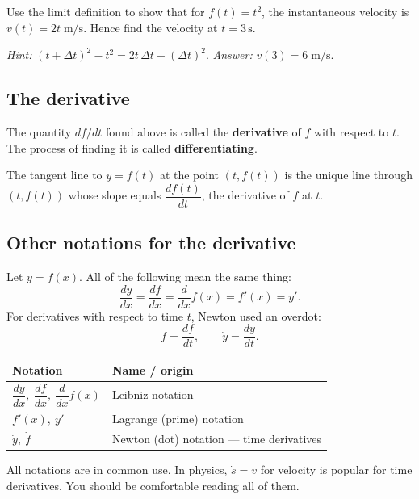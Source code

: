 \begin{tryit}[3.2: Limit definition for $f(t)=t^2$]
Use the limit definition to show that for $f(t)=t^2$, the instantaneous velocity is
$v(t)=2t\;\text{m/s}$. Hence find the velocity at $t=3\,\text{s}$.

\textit{Hint:} $(t+\Delta t)^2-t^2=2t\,\Delta t+(\Delta t)^2$. \textit{Answer:} $v(3)=6\;\text{m/s}$.
\end{tryit}

\subsection{The derivative}

The quantity $df/dt$ found above is called the \textbf{derivative} of $f$ with respect to $t$.
The process of finding it is called \textbf{differentiating}.

\begin{keybox}
The tangent line to $y=f(t)$ at the point $(t,f(t))$ is the unique line through $(t,f(t))$
whose slope equals $\dfrac{df(t)}{dt}$, the derivative of $f$ at $t$.
\end{keybox}

\subsection{Other notations for the derivative}

Let $y=f(x)$. All of the following mean the same thing:
\[
  \frac{dy}{dx} = \frac{df}{dx} = \frac{d}{dx}f(x) = f'(x) = y'.
\]
For derivatives with respect to time $t$, Newton used an overdot:
\[
  \dot{f} = \frac{df}{dt}, \qquad \dot{y} = \frac{dy}{dt}.
\]

\begin{center}
\begin{tabular}{ll}
  \toprule
  \textbf{Notation} & \textbf{Name / origin} \\
  \midrule
  $\dfrac{dy}{dx},\ \dfrac{df}{dx},\ \dfrac{d}{dx}f(x)$ & Leibniz notation \\[8pt]
  $f'(x),\ y'$ & Lagrange (prime) notation \\[4pt]
  $\dot{y},\ \dot{f}$ & Newton (dot) notation --- time derivatives \\
  \bottomrule
\end{tabular}
\end{center}

All notations are in common use. In physics, $\dot{s}=v$ for velocity is popular for time
derivatives. You should be comfortable reading all of them.


